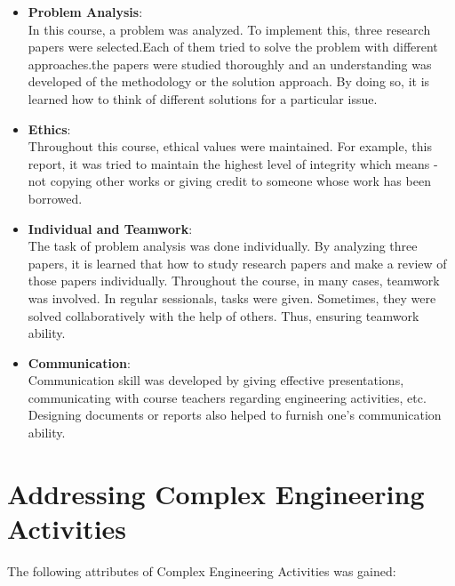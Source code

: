 \documentclass[a4paper,12pt]{article}
\begin{document}
\begin{itemize}
    \item \textbf{Problem Analysis}:\\
    In this course, a problem was analyzed. To implement this, three research papers were selected.Each of them tried to solve the problem with different approaches.the papers were studied thoroughly and an understanding was developed of the methodology or the solution approach. By doing so, it is learned how to think of different solutions for a particular issue.

    \item \textbf{Ethics}:\\
    Throughout this course, ethical values were maintained. For example, this report, it was tried to maintain the highest level of integrity which means - not copying other works or giving credit to someone whose work has been borrowed.

    \item \textbf{Individual and Teamwork}:\\
    The task of problem analysis was done individually. By analyzing three papers, it is learned that how to study research papers and make a review of those papers individually.\newline
    Throughout the course, in many cases, teamwork was involved. In regular sessionals, tasks were given. Sometimes, they were solved collaboratively with the help of others. Thus, ensuring teamwork ability.

    \item \textbf{Communication}:\\
    Communication skill was developed by giving effective presentations, communicating with course teachers regarding engineering activities, etc. Designing documents or reports also helped to furnish one's communication ability.
\end{itemize}

    
    


\section{Addressing Complex Engineering Activities}
The following attributes of Complex Engineering Activities was gained:
\end{document}
